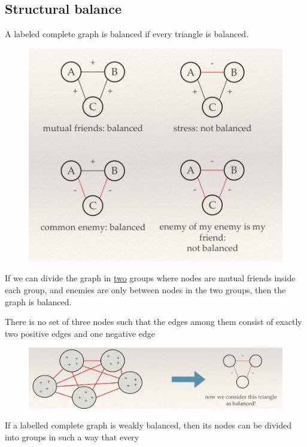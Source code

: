 \documentclass[a4paper,9pt]{extarticle}
\begin{document}
\begin{multicols*}{2}
		\subsection{Structural balance}
		\begin{riquadro}
			A labeled complete graph is balanced if every triangle is balanced.
		\end{riquadro}
		\begin{figure}[H]
			\centering
			\includegraphics[width=0.7\linewidth]{screenshot001}
			\label{fig:screenshot001}
		\end{figure}
		\begin{riquadro}
			If we can divide the graph in \underline{two} groups where nodes are mutual friends
			inside each group, and enemies are only between nodes in the two groups, then the graph
			is balanced.
		\end{riquadro}
		\begin{riquadro}
			There is no set of three nodes such that the edges among them consist of exactly two
			positive edges and one negative edge
		\end{riquadro}
		\begin{figure}[H]
			\centering
			\includegraphics[width=0.7\linewidth]{screenshot002}
			\label{fig:screenshot002}
		\end{figure}
		\begin{riquadro}
			If a labelled complete graph
			is weakly balanced, then its nodes can be divided into groups in such a way that every

\end{riquadro}
\end{multicols*}
\end{document}
